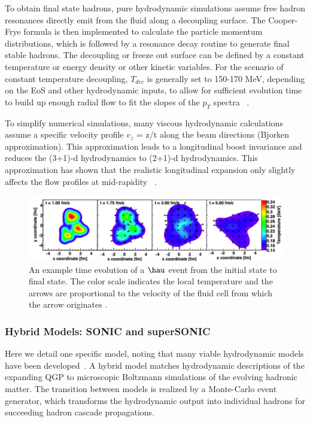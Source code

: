 To obtain final state hadrons, pure hydrodynamic simulations assume free hadron resonances directly emit from the fluid along a decoupling surface. The Cooper-Frye formula \cite{PhysRevD.10.186} is then implemented to calculate the particle momentum distributions, which is followed by a resonance decay routine to generate final stable hadrons. The decoupling or freeze out surface can be defined by a constant temperature or energy density or other kinetic variables. For the scenario of constant temperature decoupling, $T_{dec}$ is generally set to 150-170 MeV, depending on the EoS and other hydrodynamic inputs, to allow for sufficient evolution time to build up enough radial flow to fit the slopes of the $p_T$ spectra ~\cite{Kolb:2003dz}.

To simplify numerical simulations, many viscous hydrodynamic calculations assume a specific velocity profile $v_z$ = z/t along the beam directions (Bjorken approximation). This approximation leads to a longitudinal boost invariance and reduces the (3+1)-d hydrodynamics to (2+1)-d hydrodynamics. This approximation has shown that the realistic longitudinal expansion only slightly affects the flow profiles at mid-rapidity ~\cite{Song2015}. 

\begin{figure}[h!]
\begin{center}
\includegraphics[width=0.69\linewidth]{figs/he3au_simulation.png}
\caption{An example time evolution of a $\hau$ event from the initial state to final state. The color scale indicates the local temperature and the arrows are proportional to the velocity of the fluid cell from which the arrow originates \cite{PhysRevLett.113.112301}.}
\label{fig:heau_sim_evolve}
\end{center}
\end{figure}

\subsubsection{Hybrid Models: SONIC and superSONIC}
Here we detail one specific model, noting that many viable hydrodynamic models have been developed~\cite{Bhalerao:2014owa}.
A hybrid model matches hydrodynamic descriptions of the expanding QGP to microscopic Boltzmann simulations of the evolving hadronic matter. The transition between models is realized by a Monte-Carlo event generator, which transforms the hydrodynamic output into individual hadrons for succeeding hadron cascade propagations. 

